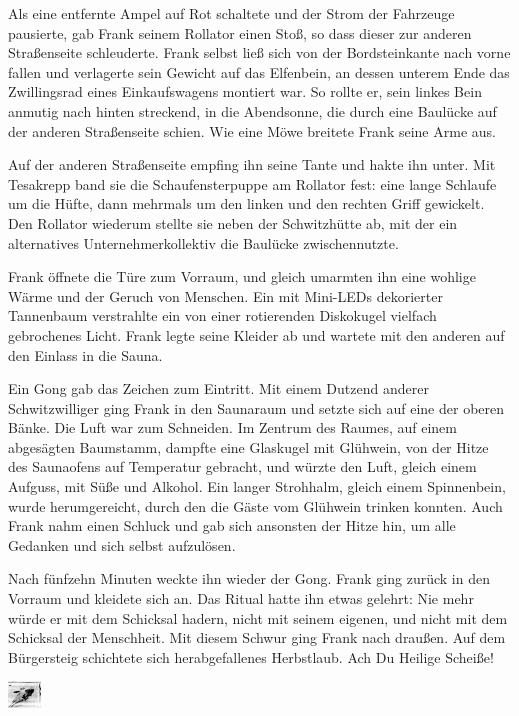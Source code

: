 \documentclass [a4paper, 11pt] {article}
\begin{document}
Als eine entfernte Ampel auf Rot schaltete und der Strom der Fahrzeuge pausierte, gab Frank seinem Rollator einen Stoß, so dass dieser zur anderen Straßenseite schleuderte. Frank selbst ließ sich von der Bordsteinkante nach vorne fallen und verlagerte sein Gewicht auf das Elfenbein, an dessen unterem Ende das Zwillingsrad eines Einkaufswagens montiert war. So rollte er, sein linkes Bein anmutig nach hinten streckend, in die Abendsonne, die durch eine Baulücke auf der anderen Straßenseite schien. Wie eine Möwe breitete Frank seine Arme aus.

Auf der anderen Straßenseite empfing ihn seine Tante und hakte ihn unter. Mit Tesakrepp band sie die Schaufensterpuppe am Rollator fest: eine lange Schlaufe um die Hüfte, dann mehrmals um den linken und den rechten Griff gewickelt. Den Rollator wiederum stellte sie neben der Schwitzhütte ab, mit der ein alternatives Unternehmerkollektiv die Baulücke zwischennutzte.

Frank öffnete die Türe zum Vorraum, und gleich umarmten ihn eine wohlige Wärme und der Geruch von Menschen. Ein mit Mini-LEDs dekorierter Tannenbaum verstrahlte ein von einer rotierenden Diskokugel vielfach gebrochenes Licht. Frank legte seine Kleider ab und wartete mit den anderen auf den Einlass in die Sauna. 

Ein Gong gab das Zeichen zum Eintritt. Mit einem Dutzend anderer Schwitzwilliger ging Frank in den Saunaraum und setzte sich auf eine der oberen Bänke. Die Luft war zum Schneiden. Im Zentrum des Raumes, auf einem abgesägten Baumstamm, dampfte eine Glaskugel mit Glühwein, von der Hitze des Saunaofens auf Temperatur gebracht, und würzte den Luft, gleich einem Aufguss, mit Süße und Alkohol. Ein langer Strohhalm, gleich einem Spinnenbein, wurde herumgereicht, durch den die Gäste vom Glühwein trinken konnten. Auch Frank nahm einen Schluck und gab sich ansonsten der Hitze hin, um alle Gedanken und sich selbst aufzulösen.


Nach fünfzehn Minuten weckte ihn wieder der Gong. Frank ging zurück in den Vorraum und kleidete sich an. Das Ritual hatte ihn etwas gelehrt: Nie mehr würde er mit dem Schicksal hadern, nicht mit seinem eigenen, und nicht mit dem Schicksal der Menschheit. Mit diesem Schwur ging Frank nach draußen. Auf dem Bürgersteig schichtete sich herabgefallenes Herbstlaub. Ach Du Heilige Scheiße!
\begin{center}
\includegraphics[height=0.7cm]{../jumper}%
\end{center}
\end{document}
